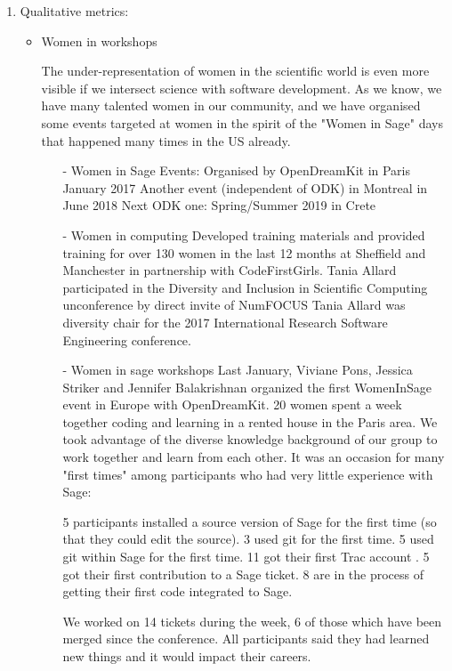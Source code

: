 \begin{enumerate}
\item Qualitative metrics:
\begin{itemize}
\item Women in \Sage workshops

 The under-representation of women in the scientific world is even more visible if we intersect science with software
  development. As we know, we have many talented women in our community, and we have organised some events targeted at women in the
  spirit of the "Women in Sage" days that happened many times in the US already. %
\begin{itemize}
 \item[-] Women in Sage Events:
    Organised by OpenDreamKit in Paris January 2017
    Another event (independent of ODK) in Montreal in June 2018
    Next ODK one: Spring/Summer 2019 in Crete

 \item[-] Women in computing
    Developed training materials and provided training for over 130 women in the last 12 months at Sheffield and Manchester in partnership 
    with CodeFirstGirls.
    Tania Allard participated in the Diversity and Inclusion in Scientific Computing unconference by direct invite of NumFOCUS
    Tania Allard was diversity chair for the 2017 International Research Software Engineering conference.

 \item[-] Women in sage workshops
    Last January, Viviane Pons, Jessica Striker and Jennifer Balakrishnan organized the first WomenInSage event in Europe with OpenDreamKit.      
    20 women spent a week together coding and learning in a rented house in the Paris area.
    We took advantage of the diverse knowledge background of our group to work together and learn from each other. It was an occasion for 
    many "first times" among participants who had very little experience with Sage:

    5 participants installed a source version of Sage for the first time (so that they could edit the source).
    3 used git for the first time.
    5 used git within Sage for the first time.
    11 got their first Trac account .
    5 got their first contribution to a Sage ticket.
    8 are in the process of getting their first code integrated to Sage.

We worked on 14 tickets during the week, 6 of those which have been merged since the conference. All participants said they had learned new 
things and it would impact their careers. %
\end{itemize}


\end{itemize}
\end{enumerate}
